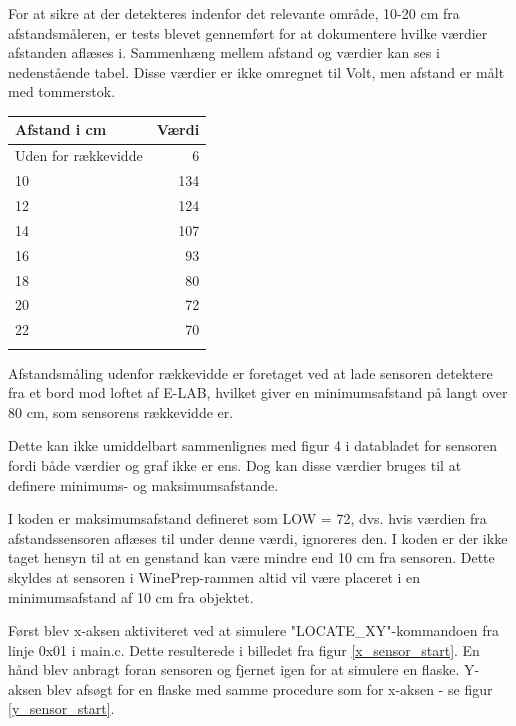 For at sikre at der detekteres indenfor det relevante område, 10-20 cm fra afstandsmåleren, er tests blevet gennemført for at dokumentere hvilke værdier afstanden aflæses i. Sammenhæng mellem afstand og værdier kan ses i nedenstående tabel. Disse værdier er ikke omregnet til Volt, men afstand er målt med tommerstok.
\begin{table}[H]
\begin{tabular}{| l | r |}
	Afstand i cm & Værdi\\\hline
	Uden for rækkevidde & 6\\\hline
	10 & 134\\\hline
	12 & 124\\\hline
	14 & 107\\\hline
	16 & 93\\\hline
	18 & 80\\\hline
	20 & 72\\\hline
	22 & 70\\\hline
	\label{Afstand-vaerdier}
\end{tabular}
\end{table}

Afstandsmåling udenfor rækkevidde er foretaget ved at lade sensoren detektere fra et bord mod loftet af E-LAB, hvilket giver en minimumsafstand på langt over 80 cm, som sensorens rækkevidde er.

Dette kan ikke umiddelbart sammenlignes med figur 4 i databladet for sensoren fordi både værdier og graf ikke er ens. Dog kan disse værdier bruges til at definere minimums- og maksimumsafstande.

I koden er maksimumsafstand defineret som LOW = 72, dvs. hvis værdien fra afstandssensoren aflæses til under denne værdi, ignoreres den. I koden er der ikke taget hensyn til at en genstand kan være mindre end 10 cm fra sensoren. Dette skyldes at sensoren i WinePrep-rammen altid vil være placeret i en minimumsafstand af 10 cm fra objektet.

Først blev x-aksen aktiviteret ved at simulere "LOCATE{\_}XY"-kommandoen fra linje 0x01 i main.c. Dette resulterede i billedet fra figur \ref{x_sensor_start}. En hånd blev anbragt foran sensoren og fjernet igen for at simulere en flaske. Y-aksen blev afsøgt for en flaske med samme procedure som for x-aksen - se figur \ref{y_sensor_start}.


